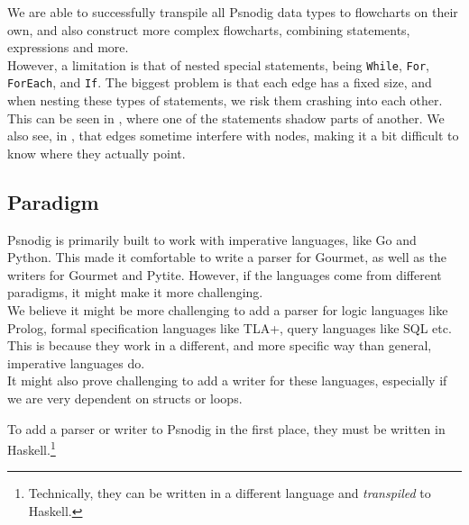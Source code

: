 We are able to successfully transpile all Psnodig data types to flowcharts on their own, and also construct more complex flowcharts, combining statements, expressions and more. \\

However, a limitation is that of nested special statements, being \texttt{While}, \texttt{For}, \texttt{ForEach}, and \texttt{If}. The biggest problem is that each edge has a fixed size, and when nesting these types of statements, we risk them crashing into each other. This can be seen in , where one of the statements shadow parts of another. We also see, in , that edges sometime interfere with nodes, making it a bit difficult to know where they actually point.

\subsection{Paradigm}

Psnodig is primarily built to work with imperative languages, like Go and Python. This made it comfortable to write a parser for Gourmet, as well as the writers for Gourmet and Pytite. However, if the languages come from different paradigms, it might make it more challenging. \\

We believe it might be more challenging to add a parser for logic languages like Prolog, formal specification languages like TLA+, query languages like SQL etc. This is because they work in a different, and more specific way than general, imperative languages do. \\

It might also prove challenging to add a writer for these languages, especially if we are very dependent on structs or loops.


To add a parser or writer to Psnodig in the first place, they must be written in Haskell.\footnote{Technically, they can be written in a different language and \textit{transpiled} to Haskell.}